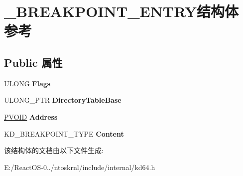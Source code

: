 \hypertarget{struct___b_r_e_a_k_p_o_i_n_t___e_n_t_r_y}{}\section{\+\_\+\+B\+R\+E\+A\+K\+P\+O\+I\+N\+T\+\_\+\+E\+N\+T\+R\+Y结构体 参考}
\label{struct___b_r_e_a_k_p_o_i_n_t___e_n_t_r_y}
\subsection*{Public 属性}
\begin{DoxyCompactItemize}
\item 
\mbox{\label{struct___b_r_e_a_k_p_o_i_n_t___e_n_t_r_y_a9263ac26913e1cda8bdde29a6567b544}} 
U\+L\+O\+NG {\bfseries Flags}
\item 
\mbox{\label{struct___b_r_e_a_k_p_o_i_n_t___e_n_t_r_y_a8e1aafa5234d8803692e02c94840fbd4}} 
U\+L\+O\+N\+G\+\_\+\+P\+TR {\bfseries Directory\+Table\+Base}
\item 
\mbox{\label{struct___b_r_e_a_k_p_o_i_n_t___e_n_t_r_y_abd9747c1def81d6f6bc14c7a930ebd57}} 
\hyperlink{interfacevoid}{P\+V\+O\+ID} {\bfseries Address}
\item 
\mbox{\label{struct___b_r_e_a_k_p_o_i_n_t___e_n_t_r_y_a1db2420d4f86f5112369151679610a57}} 
K\+D\+\_\+\+B\+R\+E\+A\+K\+P\+O\+I\+N\+T\+\_\+\+T\+Y\+PE {\bfseries Content}
\end{DoxyCompactItemize}


该结构体的文档由以下文件生成\+:\begin{DoxyCompactItemize}
\item 
E\+:/\+React\+O\+S-\/0../ntoskrnl/include/internal/kd64.\+h\end{DoxyCompactItemize}
